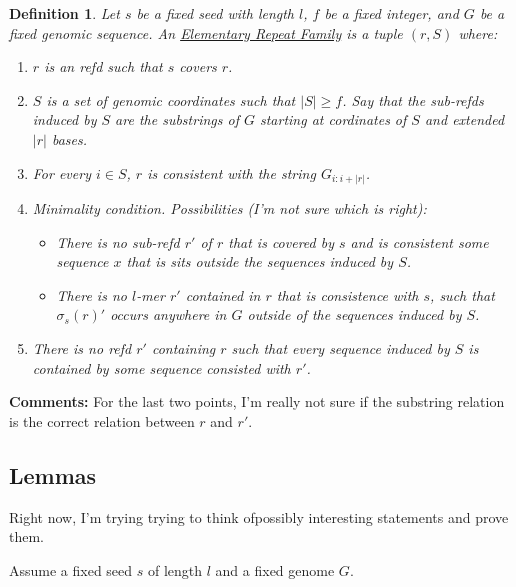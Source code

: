 \documentclass{article}
\newtheorem{definition}{Definition}
\begin{document}
\begin{definition}
Let $s$ be a fixed seed with length $l$, $f$ be a fixed integer, and $G$ be a fixed
genomic sequence.  An
\underline{Elementary Repeat Family} is a tuple $(r,S)$ where: 
\begin{enumerate}
\item $r$ is an refd such that $s$ covers $r$. 
\item $S$ is a set of genomic coordinates such that $|S| \geq f$.  Say
  that the sub-refds induced by $S$ are the substrings of $G$ starting
  at cordinates of $S$ and extended $|r|$ bases.
\item For every $i \in S$, $r$ is consistent with the string
  $G_{i:i+|r|}$.
\item Minimality condition.  Possibilities (I'm not sure which is
  right):
  \begin{itemize}
  \item There is no sub-refd $r'$ of $r$ that is covered by $s$ and is
     consistent some sequence $x$ that is sits outside the sequences
      induced by $S$.
  \item There is no $l$-mer $r'$ contained in $r$ that is consistence
    with $s$, such that $\sigma_s(r)'$ occurs anywhere in $G$ outside
    of the sequences induced by $S$.
 \end{itemize}
\item There is no refd $r'$ containing $r$ such that every sequence
  induced by $S$ is contained by some sequence consisted with $r'$.
\end{enumerate}
\end{definition}

{\bf Comments:} For the last two points, I'm really not sure if the
substring relation is the correct relation between $r$ and $r'$.


\subsection{Lemmas}

Right now, I'm trying trying to think ofpossibly interesting
statements and prove them.

Assume a fixed seed $s$ of length $l$ and a fixed genome $G$.
\end{document}
